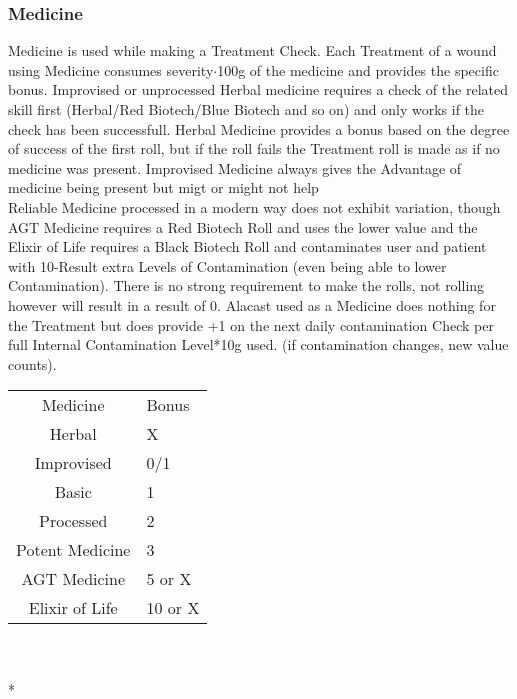 \documentclass{article}
\begin{document}
    \subsubsection{Medicine}
    Medicine is used while making a Treatment Check. Each Treatment of a wound using Medicine consumes
    severity\(\cdot\)100g of the medicine and provides the specific bonus. Improvised or unprocessed Herbal medicine
    requires a check of the related skill first (Herbal/Red Biotech/Blue Biotech and so on) and only works if the check
    has been successfull. Herbal Medicine provides a bonus based on the degree of success of the first roll, but if the
    roll fails the Treatment roll is made as if no medicine was present. Improvised Medicine always gives the Advantage
    of medicine being present but migt or might not help\\
    Reliable Medicine processed in a modern way does not exhibit variation, though AGT Medicine requires a Red Biotech
    Roll and uses the lower value and the Elixir of Life requires a Black Biotech Roll and contaminates user and patient
    with 10-Result extra Levels of Contamination (even being able to lower Contamination). There is no strong
    requirement to make the rolls, not rolling however will result in a result of 0.
    Alacast used as a Medicine does nothing for the Treatment but does provide +1 on the next daily contamination Check
    per full Internal Contamination Level*10g used. (if contamination changes, new value counts).
    \begin{tabular}{cl}
        Medicine & Bonus\\
        Herbal & X\\
        Improvised & 0/1\\
        Basic & 1\\
        Processed & 2\\
        Potent Medicine & 3\\
        AGT Medicine & 5 or X\\
        Elixir of Life & 10 or X\\
    \end{tabular}\\\\*
\end{document}
